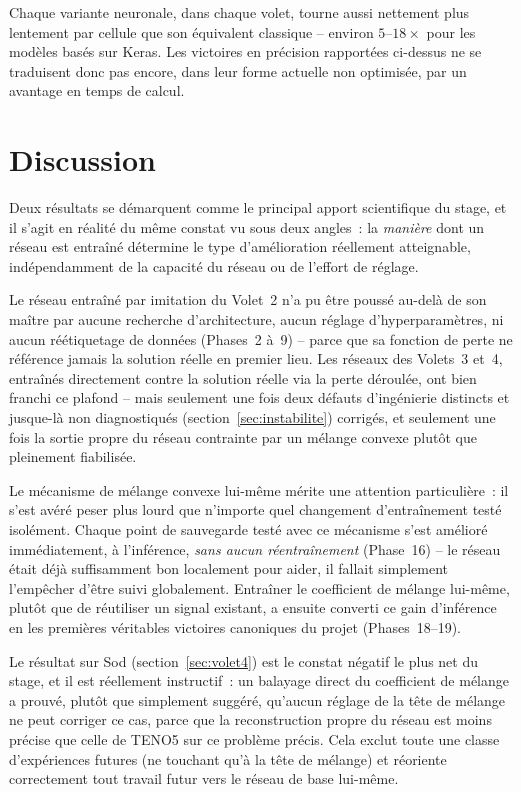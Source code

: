 \documentclass[11pt]{article}
\begin{document}
Chaque variante neuronale, dans chaque volet, tourne aussi nettement plus
lentement par cellule que son équivalent classique -- environ
$5$--$18\times$ pour les modèles basés sur Keras. Les victoires en
précision rapportées ci-dessus ne se traduisent donc pas encore, dans leur
forme actuelle non optimisée, par un avantage en temps de calcul.

\section{Discussion}

Deux résultats se démarquent comme le principal apport scientifique du
stage, et il s'agit en réalité du même constat vu sous deux angles~: la
\emph{manière} dont un réseau est entraîné détermine le type
d'amélioration réellement atteignable, indépendamment de la capacité du
réseau ou de l'effort de réglage.

Le réseau entraîné par imitation du Volet~2 n'a pu être poussé au-delà de
son maître par aucune recherche d'architecture, aucun réglage
d'hyperparamètres, ni aucun réétiquetage de données (Phases~2 à~9) --
parce que sa fonction de perte ne référence jamais la solution réelle en
premier lieu. Les réseaux des Volets~3 et~4, entraînés directement contre
la solution réelle via la perte déroulée, ont bien franchi ce plafond --
mais seulement une fois deux défauts d'ingénierie distincts et jusque-là
non diagnostiqués (section~\ref{sec:instabilite}) corrigés, et seulement
une fois la sortie propre du réseau contrainte par un mélange convexe
plutôt que pleinement fiabilisée.

Le mécanisme de mélange convexe lui-même mérite une attention
particulière~: il s'est avéré peser plus lourd que n'importe quel
changement d'entraînement testé isolément. Chaque point de sauvegarde
testé avec ce mécanisme s'est amélioré immédiatement, à l'inférence,
\emph{sans aucun réentraînement} (Phase~16) -- le réseau était déjà
suffisamment bon localement pour aider, il fallait simplement l'empêcher
d'être suivi globalement. Entraîner le coefficient de mélange lui-même,
plutôt que de réutiliser un signal existant, a ensuite converti ce gain
d'inférence en les premières véritables victoires canoniques du projet
(Phases~18--19).

Le résultat sur Sod (section~\ref{sec:volet4}) est le constat négatif le
plus net du stage, et il est réellement instructif~: un balayage direct du
coefficient de mélange a prouvé, plutôt que simplement suggéré, qu'aucun
réglage de la tête de mélange ne peut corriger ce cas, parce que la
reconstruction propre du réseau est moins précise que celle de TENO5 sur
ce problème précis. Cela exclut toute une classe d'expériences futures (ne
touchant qu'à la tête de mélange) et réoriente correctement tout travail
futur vers le réseau de base lui-même.
\end{document}
